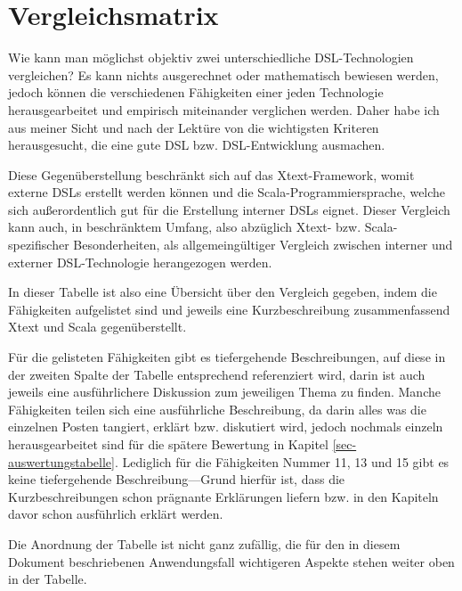\section{Vergleichsmatrix}\label{sec-vergleichsmatrix}

Wie kann man möglichst objektiv zwei unterschiedliche DSL-Technologien
vergleichen? Es kann nichts ausgerechnet oder mathematisch bewiesen werden,
jedoch können die verschiedenen Fähigkeiten einer jeden Technologie
herausgearbeitet und empirisch miteinander verglichen werden.
Daher habe ich aus meiner Sicht und nach der Lektüre von
\cite{dsls} die wichtigsten Kriteren herausgesucht, die eine gute DSL
bzw. DSL-Entwicklung ausmachen.

Diese Gegenüberstellung beschränkt sich auf das Xtext-Framework, womit
externe DSLs erstellt werden können und die Scala-Programmiersprache,
welche sich außerordentlich gut für die Erstellung interner DSLs eignet.
Dieser Vergleich kann auch, in beschränktem Umfang, also abzüglich
Xtext- bzw. Scala-spezifischer Besonderheiten, als allgemeingültiger
Vergleich zwischen interner und externer DSL-Technologie herangezogen werden.

In dieser Tabelle ist also eine Übersicht über den Vergleich gegeben, indem
die Fähigkeiten aufgelistet sind und jeweils eine Kurzbeschreibung
zusammenfassend Xtext und Scala gegenüberstellt.

Für die gelisteten Fähigkeiten gibt es
tiefergehende Beschreibungen, auf diese
in der zweiten Spalte der Tabelle entsprechend referenziert wird, darin
ist auch jeweils eine ausführlichere Diskussion zum jeweiligen Thema zu finden.
Manche Fähigkeiten teilen sich eine ausführliche Beschreibung, da darin
alles was die einzelnen Posten tangiert, erklärt bzw. diskutiert wird, jedoch
nochmals einzeln herausgearbeitet sind für die spätere Bewertung in
Kapitel \ref{sec-auswertungstabelle}.
Lediglich für die Fähigkeiten Nummer 11, 13 und 15 gibt es keine
tiefergehende Beschreibung---Grund hierfür ist, dass
die Kurzbeschreibungen schon prägnante Erklärungen liefern bzw. in den
Kapiteln davor schon ausführlich erklärt werden.

Die Anordnung der Tabelle ist nicht ganz zufällig, die für den in diesem
Dokument beschriebenen Anwendungsfall wichtigeren Aspekte stehen weiter oben
in der Tabelle.

